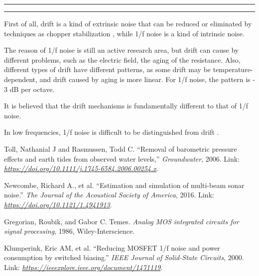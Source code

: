 \documentclass[11pt]{article}
\newcounter{questionCounter}
\newcounter{partCounter}[questionCounter]
\newenvironment{question}[2][\arabic{questionCounter}]{%
    \addtocounter{questionCounter}{1}%
    \setcounter{partCounter}{0}%
    \vspace{.25in} \hrule \vspace{0.5em}%
        \noindent{\bf #2}%
    \vspace{0.8em} \hrule \vspace{.10in}%
}{}
\begin{document}
\begin{question}{Problem 8}
First of all, drift is a kind of extrinsic noise that can be reduced or eliminated by techniques as chopper stabilization \cite{chopper}, while 1/f noise is a kind of intrinsic noise.

The reason of 1/f noise is still an active research area, but drift can cause by different problems, such as the electric field, the aging of the resistance. Also, different types of drift have different patterns, as some drift may be temperature-dependent, and drift caused by aging is more linear. For 1/f noise, the pattern is ‐3 dB per octave.

It is believed that the drift mechanisms is fundamentally different to that of 1/f noise. 

In low frequencies, 1/f noise is difficult to be distinguished from drift \cite{dist}. 

\end{question}

\begin{thebibliography}{1}
 Toll, Nathanial J and Rasmussen, Todd C. ``Removal of barometric pressure effects and earth tides from observed water levels,'' \emph{Groundwater}, 2006. Link: \label{et}\emph{\uline{https://doi.org/10.1111/j.1745-6584.2006.00254.x}}. 

 Newcombe, Richard A., et al. ``Estimation and simulation of multi-beam sonar noise.'' \emph{The Journal of the Acoustical Society of America}, 2016. Link: \label{es}\emph{\uline{https://doi.org/10.1121/1.4941913}}.

 Gregorian, Roubik, and Gabor C. Temes. \emph{Analog MOS integrated circuits for signal processing}, 1986, Wiley-Interscience.

 Klumperink, Eric AM, et al. ``Reducing MOSFET 1/f noise and power consumption by switched biasing.'' \emph{IEEE Journal of Solid-State Circuits}, 2000. Link: \label{es}\emph{\uline{https://ieeexplore.ieee.org/document/1471119}}.
\end{thebibliography}
\end{document}
